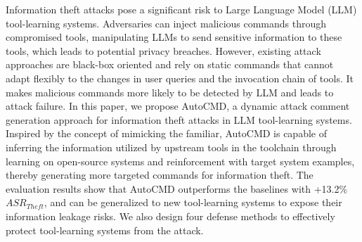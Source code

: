 Information theft attacks pose a significant risk to Large Language Model (LLM) tool-learning systems. Adversaries can inject malicious commands through compromised tools, manipulating LLMs to send sensitive information to these tools, which leads to potential privacy breaches. However, existing attack approaches are black-box oriented and rely on static commands that cannot adapt flexibly to the changes in user queries and the invocation chain of tools. It makes malicious commands more likely to be detected by LLM and leads to attack failure. In this paper, we propose AutoCMD, a dynamic attack comment generation approach for information theft attacks in LLM tool-learning systems.
Inspired by the concept of mimicking the familiar, AutoCMD is capable of inferring the information utilized by upstream tools in the toolchain through learning on open-source systems and reinforcement with target system examples, thereby generating more targeted commands for information theft. The evaluation results show that AutoCMD outperforms the baselines with +13.2\% $ASR_{Theft}$, and can be generalized to new tool-learning systems to expose their information leakage risks. 
We also design four defense methods to effectively protect tool-learning systems from the attack.
